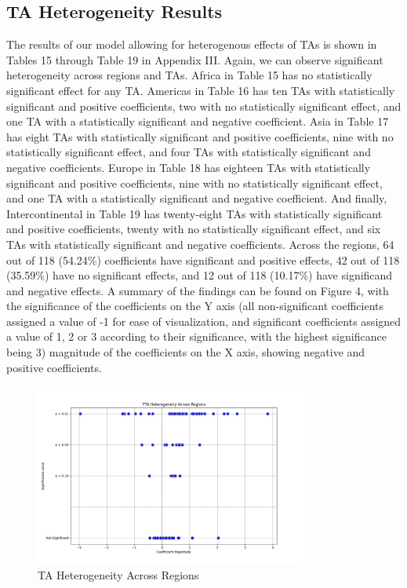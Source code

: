 \documentclass[12pt]{article}%
\begin{document}
\subsection{TA Heterogeneity Results}%
\label{subsec:TAHeterogeneityResults}%
The results of our model allowing for heterogenous effects of TAs is
shown in Tables 15 through Table 19 in Appendix III. Again, we can
observe significant heterogeneity across regions and TAs. Africa in
Table 15 has no statistically significant effect for any TA. Americas in
Table 16 has ten TAs with statistically significant and positive
coefficients, two with no statistically significant effect, and one TA
with a statistically significant and negative coefficient. Asia in Table
17 has eight TAs with statistically significant and positive
coefficients, nine with no statistically significant effect, and four
TAs with statistically significant and negative coefficients. Europe in
Table 18 has eighteen TAs with statistically significant and positive
coefficients, nine with no statistically significant effect, and one TA
with a statistically significant and negative coefficient. And finally,
Intercontinental in Table 19 has twenty-eight TAs with statistically
significant and positive coefficients, twenty with no statistically
significant effect, and six TAs with statistically significant and
negative coefficients. Across the regions, 64 out of 118 (54.24\%)
coefficients have significant and positive effects, 42 out of 118
(35.59\%) have no significant effects, and 12 out of 118 (10.17\%) have
significand and negative effects. A summary of the findings can be found
on Figure 4, with the significance of the coefficients on the Y axis (all
non-significant coefficients assigned a value of -1 for ease of
visualization, and significant coefficients assigned a value of 1, 2 or
3 according to their significance, with the highest significance being
3) magnitude of the coefficients on the X axis, showing negative and
positive coefficients.
%


\begin{figure}[h!]%
\centering%
\includegraphics[width=0.8\textwidth]{figures/pta_het_vis.jpeg}%
\caption{TA Heterogeneity Across Regions}%
\end{figure}
\end{document}
